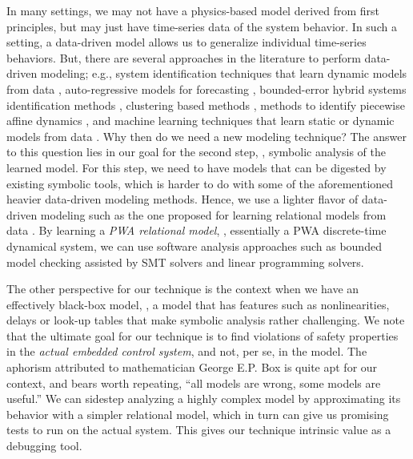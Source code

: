 In many settings, we may not have a physics-based model derived from
first principles, but may just have time-series data of the system
behavior. In such a setting, a data-driven model allows us to
generalize individual time-series behaviors. But, there are several
approaches in the literature to perform data-driven modeling; e.g.,
system identification techniques that learn dynamic models from data
\cite{ljung1999system}, auto-regressive models for forecasting
\cite{wei1994time}, bounded-error hybrid systems identification
methods \cite{bemporad2003greedy,bemporad2005bounded}, clustering
based methods \cite{ferrari2003clustering}, methods to identify
piecewise affine dynamics \cite{paoletti2007identification}, and
machine learning techniques that learn static or dynamic models from
data
\cite{narendra1990identification,lu2009linear,juloski2005bayesian}.
Why then do we need a new modeling technique? The answer to this
question lies in our goal for the second step, \ie, symbolic analysis
of the learned model. For this step, we need to have models that can
be digested by existing symbolic tools, which is harder to do with
some of the aforementioned heavier data-driven modeling methods.
Hence, we use a lighter flavor of data-driven modeling such as the one
proposed for learning relational models from data
\cite{zutshi2012timed,sankaranarayanan2011relational}. By learning a
{\em PWA relational model}, \ie, essentially a PWA discrete-time
dynamical system, we can use software analysis approaches such as
bounded model checking assisted by SMT solvers and linear programming
solvers.

The other perspective for our technique is the context when we have an
effectively black-box model, \ie, a model that has features such as
nonlinearities, delays or look-up tables that make symbolic analysis
rather challenging.  We note that the ultimate goal for our technique
is to find violations of safety properties in the {\em actual embedded
control system}, and not, per se, in the model. The aphorism
attributed to mathematician George E.P. Box is quite apt for our
context, and bears worth repeating,  ``all models are wrong, some
models are useful.'' We can sidestep analyzing a highly complex model
by approximating its behavior with a simpler relational model, which
in turn can give us promising tests to run on the actual system. This
gives our technique intrinsic value as a debugging tool.


